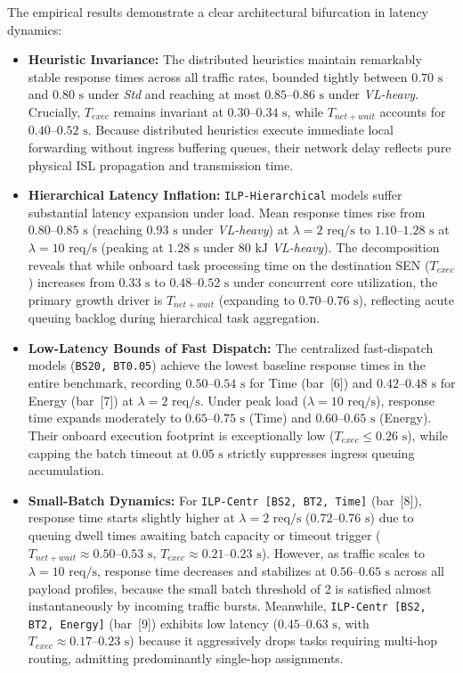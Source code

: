 The empirical results demonstrate a clear architectural bifurcation in latency dynamics:
\begin{itemize}
    \item \textbf{Heuristic Invariance:} The distributed heuristics maintain remarkably stable response times across all traffic rates, bounded tightly between $0.70\text{ s}$ and $0.80\text{ s}$ under \textit{Std} and reaching at most $0.85\text{--}0.86\text{ s}$ under \textit{VL-heavy}. Crucially, $T_{exec}$ remains invariant at $0.30\text{--}0.34\text{ s}$, while $T_{net+wait}$ accounts for $0.40\text{--}0.52\text{ s}$. Because distributed heuristics execute immediate local forwarding without ingress buffering queues, their network delay reflects pure physical ISL propagation and transmission time.
    \item \textbf{Hierarchical Latency Inflation:} \texttt{ILP-Hierarchical} models suffer substantial latency expansion under load. Mean response times rise from $0.80\text{--}0.85\text{ s}$ (reaching $0.93\text{ s}$ under \textit{VL-heavy}) at $\lambda = 2\text{ req/s}$ to $1.10\text{--}1.28\text{ s}$ at $\lambda = 10\text{ req/s}$ (peaking at $1.28\text{ s}$ under $80\text{ kJ}$ \textit{VL-heavy}). The decomposition reveals that while onboard task processing time on the destination SEN ($T_{exec}$) increases from $0.33\text{ s}$ to $0.48\text{--}0.52\text{ s}$ under concurrent core utilization, the primary growth driver is $T_{net+wait}$ (expanding to $0.70\text{--}0.76\text{ s}$), reflecting acute queuing backlog during hierarchical task aggregation.
    \item \textbf{Low-Latency Bounds of Fast Dispatch:} The centralized fast-dispatch models (\texttt{BS20, BT0.05}) achieve the lowest baseline response times in the entire benchmark, recording $0.50\text{--}0.54\text{ s}$ for Time (bar~[6]) and $0.42\text{--}0.48\text{ s}$ for Energy (bar~[7]) at $\lambda = 2\text{ req/s}$. Under peak load ($\lambda = 10\text{ req/s}$), response time expands moderately to $0.65\text{--}0.75\text{ s}$ (Time) and $0.60\text{--}0.65\text{ s}$ (Energy). Their onboard execution footprint is exceptionally low ($T_{exec} \le 0.26\text{ s}$), while capping the batch timeout at $0.05\text{ s}$ strictly suppresses ingress queuing accumulation.
    \item \textbf{Small-Batch Dynamics:} For \texttt{ILP-Centr [BS2, BT2, Time]} (bar~[8]), response time starts slightly higher at $\lambda = 2\text{ req/s}$ ($0.72\text{--}0.76\text{ s}$) due to queuing dwell times awaiting batch capacity or timeout trigger ($T_{net+wait} \approx 0.50\text{--}0.53\text{ s}$, $T_{exec} \approx 0.21\text{--}0.23\text{ s}$). However, as traffic scales to $\lambda = 10\text{ req/s}$, response time decreases and stabilizes at $0.56\text{--}0.65\text{ s}$ across all payload profiles, because the small batch threshold of 2 is satisfied almost instantaneously by incoming traffic bursts. Meanwhile, \texttt{ILP-Centr [BS2, BT2, Energy]} (bar~[9]) exhibits low latency ($0.45\text{--}0.63\text{ s}$, with $T_{exec} \approx 0.17\text{--}0.23\text{ s}$) because it aggressively drops tasks requiring multi-hop routing, admitting predominantly single-hop assignments.
\end{itemize}
\FloatBarrier

